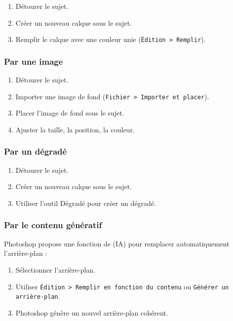 \begin{enumerate}
    \item Détourer le sujet.
    \item Créer un nouveau calque sous le sujet.
    \item Remplir le calque avec une couleur unie (\texttt{Édition > Remplir}).
\end{enumerate}

\subsubsection{Par une image}

\begin{enumerate}
    \item Détourer le sujet.
    \item Importer une image de fond (\texttt{Fichier > Importer et placer}).
    \item Placer l'image de fond sous le sujet.
    \item Ajuster la taille, la position, la couleur.
\end{enumerate}

\subsubsection{Par un dégradé}

\begin{enumerate}
    \item Détourer le sujet.
    \item Créer un nouveau calque sous le sujet.
    \item Utiliser l'outil Dégradé pour créer un dégradé.
\end{enumerate}

\subsubsection{Par le contenu génératif}

Photoshop propose une fonction de  (IA) pour remplacer automatiquement l'arrière-plan :

\begin{enumerate}
    \item Sélectionner l'arrière-plan.
    \item Utiliser \texttt{Édition > Remplir en fonction du contenu} ou \texttt{Générer un arrière-plan}.
    \item Photoshop génère un nouvel arrière-plan cohérent.
\end{enumerate}

